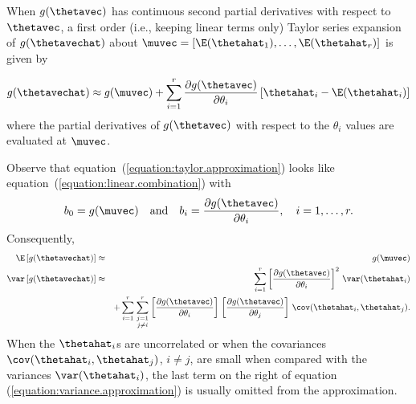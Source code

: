 When  $g(\thetavec)$ has
continuous second partial derivatives
with respect to $\thetavec$, a
first order (i.e., keeping linear terms only)
Taylor series expansion of
$g(\thetavechat)$ about 
$\muvec=\left [\E(\thetahat_{1}), \ldots, \E(\thetahat_{r}) \right ]$
is given by
\par
\begin{equation} \label{equation:taylor.approximation}
g(\thetavechat) \approx g(\muvec)+
\sum_{i=1}^{r}    \frac{\partial g(\thetavec)}
		    {\partial \theta_{i}}
		  \left [\thetahat_{i}-\E(\thetahat_{i}) \right ]
\end{equation}
where
the partial derivatives  of 
$g(\thetavec)$ with respect to the
$\theta_{i}$ values are evaluated at $\muvec$.

Observe that equation~(\ref{equation:taylor.approximation})
looks like equation~(\ref{equation:linear.combination}) with
\begin{displaymath}
b_{0}=g(\muvec) \quad \mbox{and} \quad
b_{i}=
  \frac{\partial g(\thetavec)}
		    {\partial \theta_{i}},
\quad i=1,\ldots,r.
\end{displaymath}
Consequently,
\begin{eqnarray}
\E \left [g(\thetavechat) \right ] & \approx & g(\muvec)
\nonumber
\\
\var \left[g(\thetavechat) \right ] & \approx &
\sum_{i=1}^{r} 
         \left [
    \frac{\partial g(\thetavec)}
		    {\partial \theta_{i}}
	 \right ]^{2} \, 
\var(\thetahat_{i}) 
\nonumber
\\
& &
	+ \sum_{i=1}^{r} 
	   \sum_
            {\textstyle {j=1 \atop j\ne i }}^{r} 
         \left [
    \frac{\partial g(\thetavec)}
		    {\partial \theta_{i}}
	 \right ] \, 
         \left [
     \frac{\partial g(\thetavec)}
		    {\partial \theta_{j}}
	 \right ] \, 
	 \cov(\thetahat_{i}, \thetahat_{j}).
\label{equation:variance.approximation}
\end{eqnarray}
When the $\thetahat_{i}$s are uncorrelated or
when the covariances $\cov(\thetahat_{i}, \thetahat_{j})$,
$i\ne j$, are small when
compared with  the variances $\var(\thetahat_{i})$, the
last term on the right of equation (\ref{equation:variance.approximation})
is usually omitted from the approximation.


